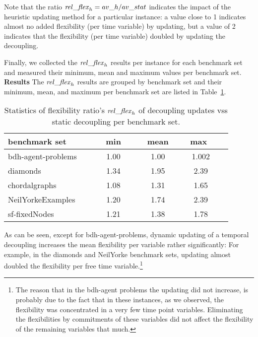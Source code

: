 Note that the ratio $\mathit{rel\_flex}_h = av\_h / av\_stat$ indicates the impact of the heuristic updating method for a particular instance: 
a value close to 1 indicates almost no added flexibility (per time variable) by updating, but a value of 2 indicates that the flexibility (per time variable)
doubled by updating the decoupling.

Finally, we collected the $\mathit{rel\_flex}_h$ results per instance for each benchmark set and measured their minimum, mean and maximum values per benchmark set.\\

\noindent
{\bf Results }
The $\mathit{rel\_flex}_h$ results are grouped by benchmark set and their minimum, mean, and maximum per benchmark set are listed in Table~\ref{table2}.

\begin{table}[h]
\begin{center}
\caption{Statistics of flexibility ratio's $\mathit{rel\_flex}_h$ of decoupling updates vss static decoupling per benchmark set.}\label{table2}
\begin{tabular}{ |  l || c c c c  | }
  \hline
  {\bf benchmark set\ \ \ }    & \ \ {\bf min\ \ } & \ \ {\bf mean\ \ }  & {\ \bf max\ \ } &\\
  \hline			
  bdh-agent-problems\ \ \   & 1.00 & 1.00 & 1.002 &  \\
  diamonds                         & 1.34 & 1.95 & 2.39 & \\
  chordalgraphs           & 1.08 & 1.31 & 1.65 &  \\
  NeilYorkeExamples  & 1.20 & 1.74 & 2.39 &  \\
  sf-fixedNodes           & 1.21 & 1.38 & 1.78 &  \\
  \hline  
\end{tabular}
\end{center}
\end{table}
As can be seen, except for bdh-agent-problems, dynamic updating of a temporal decoupling increases the mean flexibility per variable rather significantly: For example,  
in the diamonds and NeilYorke benchmark sets, updating almost doubled the flexibility per free time variable.\footnote{The reason that in the bdh-agent problems the updating did not increase, is probably due to the fact that in these instances, as we observed, the flexibility was concentrated in a very few time point variables. Eliminating the flexibilities by commitments of these variables did not affect the flexibility of the remaining variables that much.}

